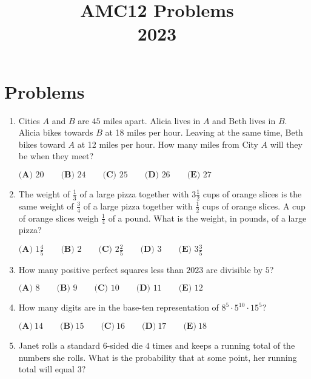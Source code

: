 \documentclass{article}
\title{AMC12 Problems \\ 2023}
\date{}
\begin{document}
\maketitle\thispagestyle{fancy}\newpage\section*{Problems}\begin{enumerate}[label=\arabic*., itemsep=0.5em]\item Cities $A$ and $B$ are $45$ miles apart. Alicia lives in $A$ and Beth lives in $B$. Alicia bikes towards $B$ at 18 miles per hour. Leaving at the same time, Beth bikes toward $A$ at 12 miles per hour. How many miles from City $A$ will they be when they meet?

$\textbf{(A) }20\qquad\textbf{(B) }24\qquad\textbf{(C) }25\qquad\textbf{(D) }26\qquad\textbf{(E) }27$\par \vspace{0.5em}\item The weight of $\frac{1}{3}$ of a large pizza together with $3 \frac{1}{2}$ cups of orange slices is the same weight of $\frac{3}{4}$ of a large pizza together with $\frac{1}{2}$ cups of orange slices. A cup of orange slices weigh $\frac{1}{4}$ of a pound. What is the weight, in pounds, of a large pizza?

$\textbf{(A) }1\frac{4}{5}\qquad\textbf{(B) }2\qquad\textbf{(C) }2\frac{2}{5}\qquad\textbf{(D) }3\qquad\textbf{(E) }3\frac{3}{5}$\par \vspace{0.5em}\item How many positive perfect squares less than $2023$ are divisible by $5$?

$\textbf{(A) }8\qquad\textbf{(B) }9\qquad\textbf{(C) }10\qquad\textbf{(D) }11\qquad\textbf{(E) }12$\par \vspace{0.5em}\item How many digits are in the base-ten representation of $8^5 \cdot 5^{10} \cdot 15^5$?

$\textbf{(A)}~14\qquad\textbf{(B)}~15\qquad\textbf{(C)}~16\qquad\textbf{(D)}~17\qquad\textbf{(E)}~18\qquad$\par \vspace{0.5em}\item Janet rolls a standard $6$-sided die $4$ times and keeps a running total of the numbers she rolls. What is the probability that at some point, her running total will equal $3?$


\end{enumerate}
\end{document}
